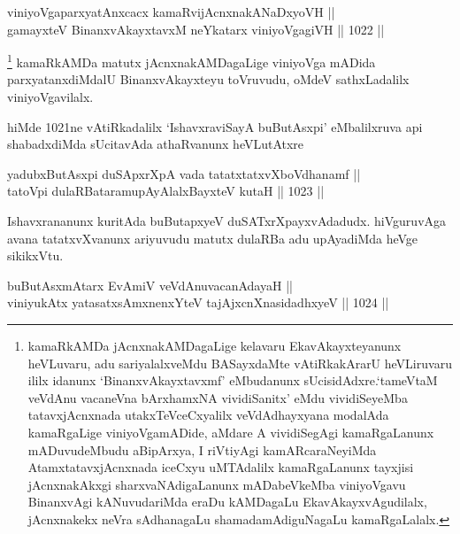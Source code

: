 
\begin{shl}
viniyoVgaparxyatAnxcacx kamaRvijAcnxnakANaDxyoVH || \\
gamayxteV BinanxvAkayxtavxM neYkatarx viniyoVgagiVH \hfill || 1022 ||  
\end{shl}

\begin{artha}
\footnote{kamaRkAMDa jAcnxnakAMDagaLige kelavaru EkavAkayxteyanunx heVLuvaru, adu sariyalalxveMdu BASayxdaMte vAtiRkakArarU heVLiruvaru ililx idanunx `BinanxvAkayxtavxmf' eMbudanunx sUcisidAdxre.`tameVtaM veVdAnu vacaneVna bArxhamxNA vividiSanitx' eMdu vividiSeyeMba tatavxjAcnxnada utakxTeVceCxyalilx veVdAdhayxyana modalAda kamaRgaLige viniyoVgamADide, aMdare A vividiSegAgi kamaRgaLanunx mADuvudeMbudu aBipArxya, I riVtiyAgi kamARcaraNeyiMda AtamxtatavxjAcnxnada iceCxyu uMTAdalilx kamaRgaLanunx tayxjisi jAcnxnakAkxgi sharxvaNAdigaLanunx mADabeVkeMba viniyoVgavu BinanxvAgi kANuvudariMda eraDu kAMDagaLu EkavAkayxvAgudilalx, jAcnxnakekx neVra sAdhanagaLu shamadamAdiguNagaLu kamaRgaLalalx.} kamaRkAMDa matutx jAcnxnakAMDagaLige viniyoVga mADida parxyatanxdiMdalU BinanxvAkayxteyu toVruvudu, oMdeV sathxLadalilx viniyoVgavilalx.
\end{artha}

\begin{artha}
hiMde 1021ne vAtiRkadalilx `IshavxraviSayA buButAsxpi' eMbalilxruva api shabadxdiMda sUcitavAda athaRvanunx heVLutAtxre\ndash 
\end{artha}

\begin{shl}
yadubxButAsx\s pi duSApxrXpA vada tatatxtatxvXboVdhanamf || \\
tatoV\s pi dulaRBataramupAyAlalxBayxteV kutaH \hfill || 1023 ||  
\end{shl}

\begin{artha}
Ishavxrananunx kuritAda buButapxyeV duSATxrXpayxvAdadudx. hiVguruvAga avana tatatxvXvanunx ariyuvudu matutx dulaRBa adu upAyadiMda heVge sikikxVtu.
\end{artha}

\begin{shl}
buButAsxmAtarx EvAmiV veVdAnuvacanAdayaH || \\
viniyukAtx yatasatxsAmxnenxYteV tajAjxcnXnasidadhxyeV \hfill || 1024 ||  
\end{shl}

